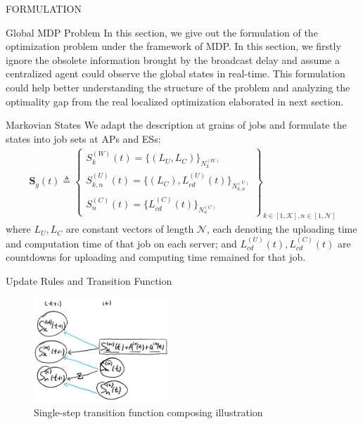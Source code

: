 \documentclass[10pt, conference, letterpaper]{IEEEtran}
\begin{document}
\begin{section}{FORMULATION}
        \begin{subsection}{Global MDP Problem}
            In this section, we give out the formulation of the optimization problem under the framework of MDP. In this section, we firstly ignore the obsolete information brought by the broadcast delay and assume a centralized agent could observe the global states in real-time. This formulation could help better understanding the structure of the problem and analyzing the optimality gap from the real localized optimization elaborated in next section.

            \begin{subsubsection}{Markovian States}
                We adapt the description at grains of jobs and formulate the states into job sets at APs and ESs:
                \begin{gather*}
                    \mathbf{S}_g(t) \triangleq
                    \begin{Bmatrix}
                        S_{k}^{(W)}(t) = \{ (L_U, L_C) \}_{N_{k}^{(W)}}
                        \\
                        S_{k,n}^{(U)}(t)= \{ (L_C), L_{cd}^{(U)}(t) \}_{N_{k,n}^{(U)}}
                        \\
                        S_{n}^{(C)}(t)  = \{ L_{cd}^{(C)}(t) \}_{N_{n}^{(C)}}
                    \end{Bmatrix}
                    _{k \in [1,\mathcal{K}], n \in [1,\mathcal{N}]}
                \end{gather*}
                where $L_U, L_C$ are constant vectors of length $\mathcal{N}$, each denoting the uploading time and computation time of that job on each server; and $L^{(U)}_{cd}(t), L^{(C)}_{cd}(t)$ are countdowns for uploading and computing time remained for that job.
            \end{subsubsection}

            \begin{subsubsection}{Update Rules and Transition Function}
                \begin{figure}[h]
                    \centering
                    \includegraphics[width=0.45\textwidth]{single-transition.png}
                    \caption{Single-step transition function composing illustration}
                    \label{fig:trans}
                \end{figure}


\end{subsubsection}
\end{subsection}
\end{section}
\end{document}
